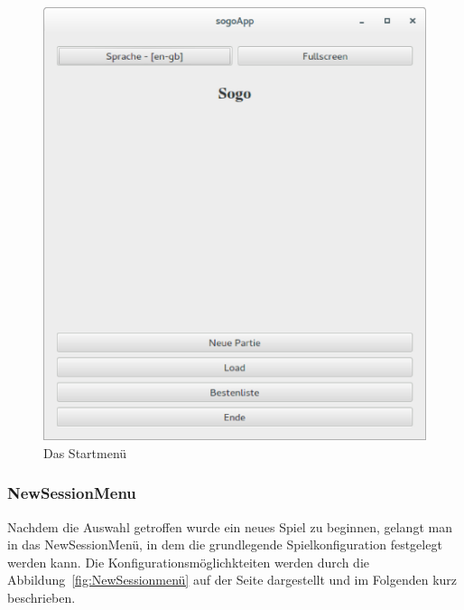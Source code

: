 \documentclass[a4paper]{scrartcl}
\begin{document}
\begin{figure}[H]
 \centering
 \includegraphics[scale=0.35]{graphics/startmenu.eps}
 \caption{Das Startmenü}
 \label{fig:Startmenü}
\end{figure}

\subsubsection{NewSessionMenu}\label{ch:NewSessionMenu}
Nachdem die Auswahl getroffen wurde ein neues Spiel zu beginnen, gelangt man in das NewSessionMenü, in dem die grundlegende Spielkonfiguration festgelegt werden kann. Die Konfigurationsmöglichkteiten werden durch die Abbildung~\ref{fig:NewSessionmenü} auf der Seite \pageref{fig:NewSessionmenü} dargestellt und im Folgenden kurz beschrieben. 
\end{document}
